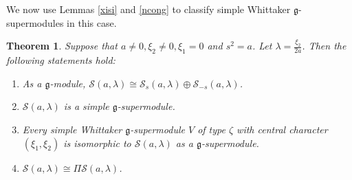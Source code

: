 \documentclass[a4paper,10pt]{article}
\theoremstyle{definition}
\theoremstyle{plain}
\newtheorem{theorem}[definition]{Theorem}
\theoremstyle{remark}
\theoremstyle{mystyle}
\numberwithin{equation}{section}
\begin{document}
We now use Lemmas \ref{xisi} and \ref{ncong} to classify simple Whittaker $\mathfrak g$-supermodules in this case.
\begin{theorem}\label{3.8}
Suppose that $a\ne 0,\xi_2\neq0,\xi_1=0$ and $s^2=a$. Let $\lambda=\frac{\xi_2}{2a}$. Then the following statements hold:
\begin{enumerate}
    \item[(1).] As a $\mathfrak g$-module, $\mathcal {S}(a,\lambda)\cong \mathcal {S}_{s}(a,\lambda)\oplus \mathcal {S}_{-s}(a,\lambda)$.
    \item[(2).] \(\mathcal {S}(a,\lambda)\) is a simple $\mathfrak g$-supermodule.
    \item[(3).] Every simple Whittaker $\mathfrak g$-supermodule \(V\) of type \(\zeta\) with central character \((\xi_1,\xi_2)\) is isomorphic to \(\mathcal {S}(a,\lambda)\) as a $\mathfrak g$-supermodule.
    \item[(4).] $\mathcal {S}(a,\lambda)\cong \Pi \mathcal {S}(a,\lambda)$.
\end{enumerate}
\end{theorem}
\end{document}
